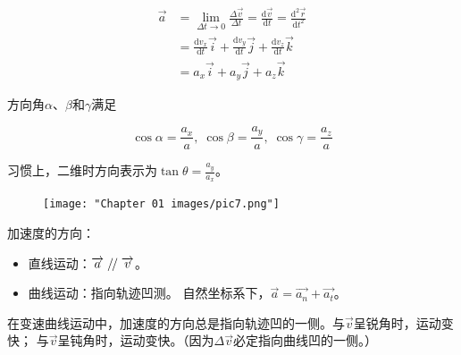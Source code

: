 \documentclass[
	12pt, %
	a4paper, %
]{myLegrandOrangeBook}
\newcommand{\rmd}{\mathrm{d}}
\renewcommand{\parallel}{\mathrel{/\mskip-2.5mu/}}
\begin{document}
    \vspace{1em}
    \begin{definition}[瞬时加速度]

        \begin{equation}
            \begin{aligned}
                \overrightarrow{a} &= \lim_{\Delta t \rightarrow 0} \frac{\Delta \overrightarrow{v}}{\Delta t}
                = \frac{\rmd \overrightarrow{v}}{\rmd t} =
                \frac{\rmd^2 \overrightarrow{r}}{\rmd t^2}
                \\
                &= \frac{\rmd v_{x}}{\rmd t} \overrightarrow{i} +
                \frac{\rmd v_{y}}{\rmd t} \overrightarrow{j} +
                \frac{\rmd v_{z}}{\rmd t} \overrightarrow{k}
                \\
                &= a_{x}\overrightarrow{i} + a_{y}\overrightarrow{j}
                + a_{z}\overrightarrow{k}
            \end{aligned}
        \end{equation}

    \end{definition}

    方向角\(\alpha\)、\(\beta\)和\(\gamma\)满足

    \[
        \cos \alpha = \frac{a_x}{a},\; \cos \beta = \frac{a_y}{a}, \;\cos \gamma = \frac{a_z}{a}
    \]

    习惯上，二维时方向表示为\(\tan \theta = \frac{a_y}{a_x}\)。
    
    \begin{figure}
        \centering
        \texttt{[image: "Chapter 01 images/pic7.png"]}
        \label{pic7}
    \end{figure}

    加速度的方向：

    \begin{itemize}
        \item 直线运动：\(\overrightarrow{a} \parallel \overrightarrow{v}\)。
        \item 曲线运动：指向轨迹凹测。
            自然坐标系下，\(\overrightarrow{a} = \overrightarrow{a_{n}} + \overrightarrow{a_{t}}\)。
    \end{itemize}

    在变速曲线运动中，加速度的方向总是指向轨迹凹的一侧。与\(\overrightarrow{v}\)呈锐角时，运动变快；
    与\(\overrightarrow{v}\)呈钝角时，运动变快。（因为\(\Delta \overrightarrow{v}\)必定指向曲线凹的一侧。）
\end{document}
